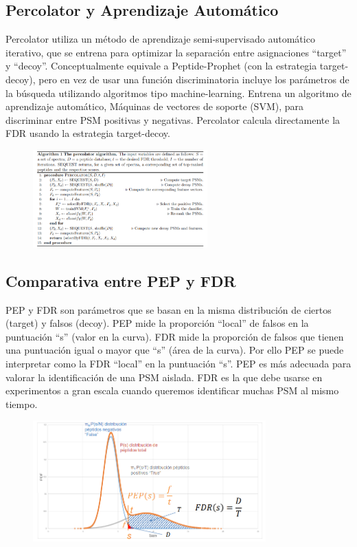 \subsection{Percolator y Aprendizaje Automático}
Percolator utiliza un método de aprendizaje semi-supervisado automático iterativo, que se entrena para optimizar la separación entre asignaciones “target” y “decoy”.
Conceptualmente equivale a Peptide-Prophet (con la estrategia target-decoy), pero en vez de usar una función discriminatoria incluye los parámetros de la búsqueda utilizando algoritmos tipo machine-learning.
Entrena un algoritmo de aprendizaje automático, Máquinas de vectores de soporte (SVM), para discriminar entre PSM positivas y negativas.
Percolator calcula directamente la FDR usando la estrategia target-decoy.

\begin{figure}[h]
\centering
\includegraphics[width = 0.6\textwidth]{figs/percolator-pseudocode.png}
\end{figure}

\subsection{Comparativa entre PEP y FDR}
PEP y FDR son parámetros que se basan en la misma distribución de ciertos (target) y falsos (decoy). PEP mide la proporción “local” de falsos en la puntuación “s” (valor en la curva). FDR mide la proporción de falsos que tienen una puntuación igual o mayor que “s” (área de la curva). Por ello PEP se puede interpretar como la FDR “local” en la puntuación “s”. PEP es más adecuada para valorar la identificación de una PSM aislada. FDR es la que debe usarse en experimentos a gran escala cuando queremos identificar muchas PSM al mismo tiempo.
\begin{figure}[h]
\centering
\includegraphics[width = 0.8\textwidth]{figs/pep-fdr.png}
\end{figure}